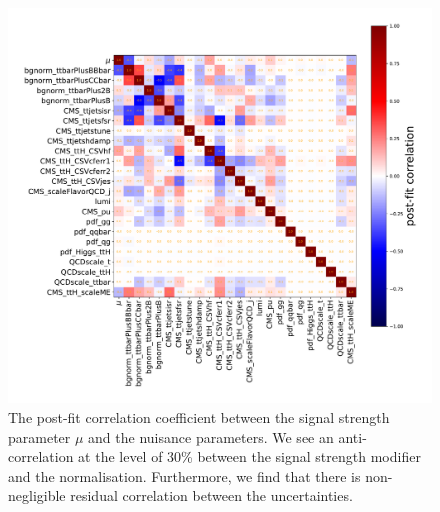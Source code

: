 \begin{figure}
\begin{centering}
\includegraphics[width = 1.0\textwidth]{figures/tth/nuis_corr.pdf}
\caption[The post-fit correlation between the signal strength parameter and the nuisance parameters]{The post-fit correlation coefficient between the signal strength parameter $\mu$ and the nuisance parameters. We see an anti-correlation at the level of 30\% between the signal strength modifier and the \ttbb\xspace normalisation. Furthermore, we find that there is non-negligible residual correlation between the uncertainties.}
\label{fig:tth_corr}
\end{centering}
\end{figure}

